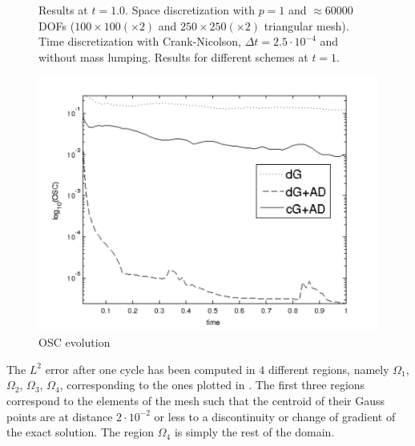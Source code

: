 \begin{figure}
\caption{ Results at $t = 1.0$. Space discretization with $p=1$ and $\approx 60000$ DOFs ($100\times 100 (\times 2)$ and $250\times 250 (\times 2)$ triangular mesh). Time discretization with Crank-Nicolson, $\Delta t = 2.5 \cdot 10^{-4}$ and without mass lumping. Results for different schemes at $t = 1 $.}\label{fig-triangle1_2}
\end{figure}

\begin{figure}
\centering
\includegraphics[clip=true, width=12cm]{Figures/paper2/20_3body_OSC.pdf}
\caption{OSC evolution}\label{fig-osc_2}
\end{figure}
The $L^2$ error after one cycle has been computed in $4$ different regions, namely $\Omega_1$, $\Omega_2$, $\Omega_3$, $\Omega_4$, corresponding to the ones plotted in . { The first three regions correspond to the elements of the mesh such that the centroid of their Gauss points are at distance $2\cdot 10^{-2}$ or less to a discontinuity or change of gradient of the exact solution. The region $\Omega_4$ is simply the rest of the domain.} 

